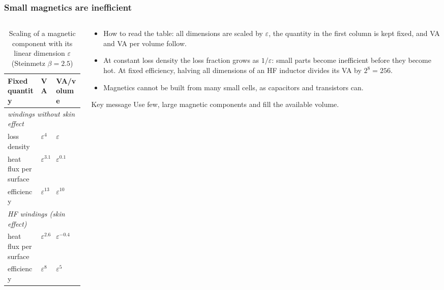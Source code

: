 \begin{frame}
	\frametitle{Small magnetics are inefficient}
	\begin{columns}[T]
		\begin{column}{0.52\textwidth}
			\begin{table}
				\centering
				\footnotesize
				\begin{tabular}{|l|l|l|}
					\hline
					\textbf{Fixed quantity}         & \textbf{VA}                    & \textbf{VA/volume}               \\
					\hline
					\multicolumn{3}{|l|}{\textit{windings without skin effect}}                                       \\
					loss density                    & $\varepsilon^{4}$              & $\varepsilon$                    \\
					heat flux per surface           & $\varepsilon^{3.1}$            & $\varepsilon^{0.1}$              \\
					efficiency                      & $\varepsilon^{13}$             & $\varepsilon^{10}$               \\
					\hline
					\multicolumn{3}{|l|}{\textit{HF windings (skin effect)}}                                          \\
					heat flux per surface           & $\varepsilon^{2.6}$            & $\varepsilon^{-0.4}$             \\
					efficiency                      & $\varepsilon^{8}$              & $\varepsilon^{5}$                \\
					\hline
				\end{tabular}
				\caption{Scaling of a magnetic component with its linear dimension $\varepsilon$ (Steinmetz $\beta=2.5$)}
			\end{table}
		\end{column}
		\begin{column}{0.45\textwidth}
			\footnotesize
			\begin{itemize}
				\item How to read the table: all dimensions are scaled by $\varepsilon$, the quantity in the first column is kept fixed, and VA and VA per volume follow.
				\item At constant loss density the loss fraction grows as $1/\varepsilon$: small parts become inefficient before they become hot. At fixed efficiency, halving all dimensions of an HF inductor divides its VA by $2^8=256$.
				\item Magnetics cannot be built from many small cells, as capacitors and transistors can.
			\end{itemize}
			\begin{block}{Key message}
				Use few, large magnetic components and fill the available volume.
			\end{block}
		\end{column}
	\end{columns}
\end{frame}

